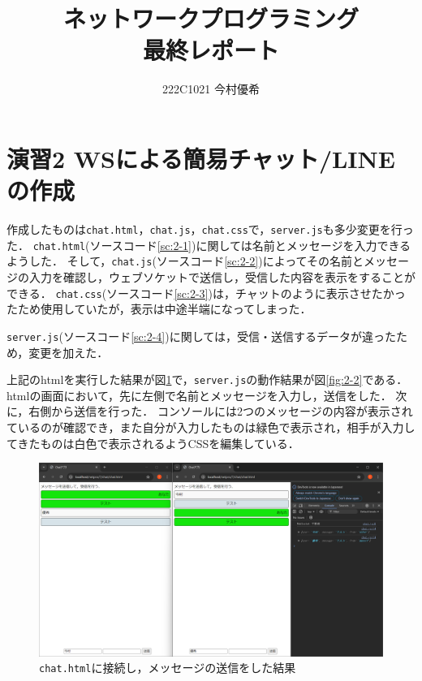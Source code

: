 \documentclass[documentclass]{jsarticle}
\begin{document}
\title{ネットワークプログラミング\\ 最終レポート}
\author{222C1021 今村優希}
\maketitle

\newpage

\section*{演習2 WSによる簡易チャット/LINEの作成}
作成したものは\texttt{chat.html}，\texttt{chat.js}，\texttt{chat.css}で，\texttt{server.js}も多少変更を行った．
\texttt{chat.html}(ソースコード\ref*{sc:2-1})に関しては名前とメッセージを入力できるようした．
そして，\texttt{chat.js}(ソースコード\ref*{sc:2-2})によってその名前とメッセージの入力を確認し，ウェブソケットで送信し，受信した内容を表示をすることができる．
\texttt{chat.css}(ソースコード\ref*{sc:2-3})は，チャットのように表示させたかったため使用していたが，表示は中途半端になってしまった．

\texttt{server.js}(ソースコード\ref*{sc:2-4})に関しては，受信・送信するデータが違ったため，変更を加えた．

上記のhtmlを実行した結果が図\ref*{fig:2-1}で，\texttt{server.js}の動作結果が図\ref*{fig:2-2}である．
htmlの画面において，先に左側で名前とメッセージを入力し，送信をした．
次に，右側から送信を行った．
コンソールには2つのメッセージの内容が表示されているのが確認でき，また自分が入力したものは緑色で表示され，相手が入力してきたものは白色で表示されるようCSSを編集している．







\begin{figure}[H]
  \begin{center}
    \includegraphics*[scale=0.35]{figure/2-1.png}
  \end{center}
  \caption[]{\texttt{chat.html}に接続し，メッセージの送信をした結果}
  \label{fig:2-1}
\end{figure}
\end{document}
